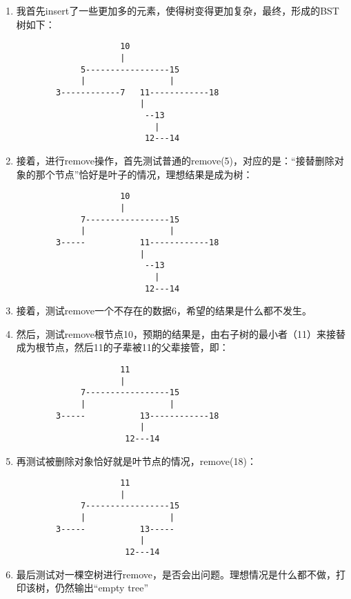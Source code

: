 \documentclass[UTF8]{ctexart}
\begin{document}
\begin{enumerate}

    \item 我首先insert了一些更加多的元素，使得树变得更加复杂，最终，形成的BST树如下：
    \begin{verbatim}
                     10
                     |
             5-----------------15
             |                 |
        3------------7   11------------18
                         |
                          --13
                            |
                          12---14
    \end{verbatim}
    \item 接着，进行remove操作，首先测试普通的remove(5)，对应的是：“接替删除对象的那个节点”恰好是叶子的情况，理想结果是成为树：
    \begin{verbatim}
                     10
                     |
             7-----------------15
             |                 |
        3-----           11------------18
                         |
                          --13
                            |
                          12---14
    \end{verbatim}

    \item 接着，测试remove一个不存在的数据6，希望的结果是什么都不发生。

    \item 然后，测试remove根节点10，预期的结果是，由右子树的最小者（11）来接替成为根节点，然后11的子辈被11的父辈接管，即：
    \begin{verbatim}
                     11
                     |
             7-----------------15
             |                 |
        3-----           13------------18
                         |
                      12---14
    \end{verbatim}
    \item 再测试被删除对象恰好就是叶节点的情况，remove(18)：
    \begin{verbatim}
                     11
                     |
             7-----------------15
             |                 |
        3-----           13-----
                         |
                      12---14
    \end{verbatim}
    \item 最后测试对一棵空树进行remove，是否会出问题。理想情况是什么都不做，打印该树，仍然输出“empty tree”



\end{enumerate}
\end{document}
